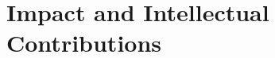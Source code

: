 \documentclass[../Dissertation]{subfiles}
\begin{document}
\section{Impact and Intellectual Contributions}\label{sec:impact}
    \lipsum[1-2]
\end{document}
